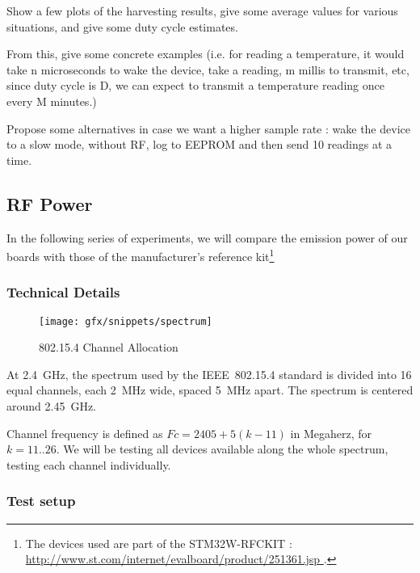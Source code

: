 
Show a few plots of the harvesting results, give some average values for various
situations, and give some duty cycle estimates.

From this, give some concrete examples (i.e. for reading a temperature, it would
take n microseconds to wake the device, take a reading, m millis to transmit,
etc, since duty cycle is D, we can expect to transmit a temperature reading once
every M minutes.)

Propose some alternatives in case we want a higher sample rate : wake the device
to a slow mode, without RF, log to EEPROM and then send 10 readings at a time.

\subsection{RF Power}

In the following series of experiments, we will compare the emission power of
our boards with those of the manufacturer's reference kit\footnote{The devices
used are part of the STM32W-RFCKIT
: \url{ http://www.st.com/internet/evalboard/product/251361.jsp }.}

\subsubsection{Technical Details}

\begin{figure}[htb]
  \begin{center}
    \texttt{[image: gfx/snippets/spectrum]}
  \end{center}
  \caption{802.15.4 Channel Allocation\citep{hunn2010}}
  \label{fig:channel-allocation}
\end{figure}

At \SI{2.4}{GHz}, the spectrum used by the IEEE~802.15.4 standard is divided
into 16 equal channels, each \SI{2}{MHz} wide, spaced \SI{5}{MHz} apart. The
spectrum is centered around \SI{2.45}{GHz}.\citep[pg. 29]{ieee802154}

Channel frequency is defined as $Fc = 2405 + 5 (k-11)$ in Megaherz, for $k
= 11..26$. We will be testing all devices available along the whole spectrum,
testing each channel individually.

\subsubsection{Test setup}

